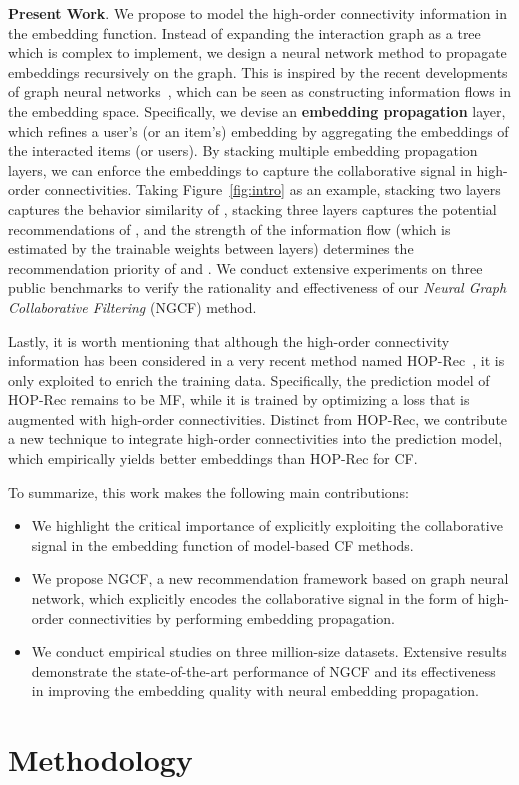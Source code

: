 \documentclass[sigconf]{acmart}
\theoremstyle{definition}
\begin{document}
\vspace{5pt}
\noindent\textbf{Present Work}. We propose to model the high-order connectivity information in the embedding function. Instead of expanding the interaction graph as a tree which is complex to implement, we design a neural network method to propagate embeddings recursively on the graph. This is inspired by the recent developments of graph neural networks~\cite{GraphSAGE,JumpKG,KGAT},
which can be seen as constructing information flows in the embedding space. Specifically, we devise an \textbf{embedding propagation} layer, which refines a user's (or an item's) embedding by aggregating the embeddings of the interacted items (or users). By stacking multiple embedding propagation layers, we can enforce the embeddings to capture the collaborative signal in high-order connectivities. Taking Figure~\ref{fig:intro} as an example, stacking two layers captures the behavior similarity of , stacking three layers captures the potential recommendations of , and the strength of the information flow (which is estimated by the trainable weights between layers) determines the recommendation priority of  and . 
We conduct extensive experiments on three public benchmarks to verify the rationality and effectiveness of our \textit{Neural Graph Collaborative Filtering} (NGCF) method. 

Lastly, it is worth mentioning that although the high-order connectivity information has been considered in a very recent method named HOP-Rec~\cite{HOP-rec}, it is only exploited to enrich the training data. Specifically, the prediction model of HOP-Rec remains to be MF, while it is trained by optimizing a loss that is augmented with high-order connectivities. Distinct from HOP-Rec, we contribute a new technique to integrate high-order connectivities into the prediction model, which empirically yields better embeddings than HOP-Rec for CF. 

To summarize, this work makes the following main contributions:
\begin{itemize}[leftmargin=*]
    \item We highlight the critical importance of explicitly exploiting the collaborative signal in the embedding function of model-based CF methods. 
    
    \item We propose NGCF, a new recommendation framework based on graph neural network, which explicitly encodes the collaborative signal in the form of high-order connectivities by performing embedding propagation.
    
    \item We conduct empirical studies on three million-size datasets. Extensive results demonstrate the state-of-the-art performance of NGCF and its effectiveness in improving the embedding quality with neural embedding propagation.
\end{itemize} \section{Methodology}
\end{document}
